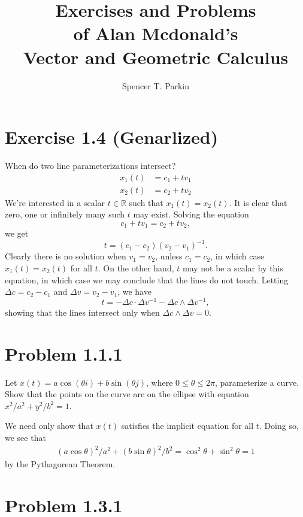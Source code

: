 \documentclass[12pt]{article}
\title{Exercises and Problems\\of Alan Mcdonald's\\Vector and Geometric Calculus}
\author{Spencer T. Parkin}
\newcommand{\R}{\mathbb{R}}
\begin{document}
\maketitle

\section*{Exercise 1.4 (Genarlized)}

When do two line parameterizations intersect?
\begin{align*}
x_1(t) &= c_1 + tv_1 \\
x_2(t) &= c_2 + tv_2
\end{align*}
We're interested in a scalar $t\in\R$ such that $x_1(t)=x_2(t)$.
It is clear that zero, one or infinitely many such $t$ may exist.
Solving the equation
\begin{equation*}
c_1+tv_1=c_2+tv_2,
\end{equation*}
we get
\begin{equation*}
t = (c_1-c_2)(v_2-v_1)^{-1}.
\end{equation*}
Clearly there is no solution when $v_1=v_2$, unless $c_1=c_2$, in which case
$x_1(t)=x_2(t)$ for all $t$.  On the other hand, $t$ may not be a scalar by
this equation, in which case we may conclude that the lines do not touch.
Letting $\Delta c=c_2-c_1$ and $\Delta v=v_2-v_1$, we have
\begin{equation*}
t = -\Delta c\cdot \Delta v^{-1} - \Delta c\wedge\Delta v^{-1},
\end{equation*}
showing that the lines intersect only when $\Delta c\wedge \Delta v=0$.

\section*{Problem 1.1.1}

Let $x(t)=a\cos(\theta i)+b\sin(\theta j)$, where $0\leq\theta\leq 2\pi$, parameterize a curve.
Show that the points on the curve are on the ellipse with equation $x^2/a^2+y^2/b^2=1$.

We need only show that $x(t)$ satisfies the implicit equation for all $t$.
Doing so, we see that
\begin{align*}
(a\cos\theta)^2/a^2 + (b\sin\theta)^2/b^2 = \cos^2 \theta+\sin^2 \theta = 1
\end{align*}
by the Pythagorean Theorem.

\section*{Problem 1.3.1}
\end{document}
